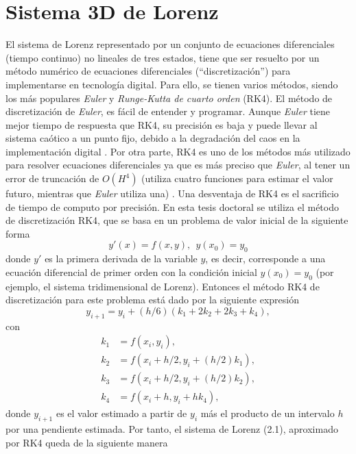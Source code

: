 \section{Sistema 3D de Lorenz}
El sistema de Lorenz representado por un conjunto de ecuaciones diferenciales (tiempo continuo) no lineales de tres estados, tiene que ser resuelto por un método numérico de ecuaciones diferenciales (``discretización'') para  implementarse en tecnología digital. Para ello, se tienen varios métodos, siendo los más populares \textit{Euler} y \textit{Runge-Kutta de cuarto orden} (RK4). El método de discretización de \textit{Euler}, es fácil de entender y programar. Aunque \textit{Euler} tiene mejor tiempo de respuesta que RK4, su precisión es baja y puede llevar al sistema caótico a un punto fijo, debido a la degradación del caos en la implementación digital \cite{ZEtAl_2011a}. Por otra parte, RK4 es uno de los métodos más utilizado para resolver ecuaciones diferenciales ya que es más preciso que \textit{Euler}, al tener un error de truncación de $O(H^{4})$ (utiliza cuatro funciones para estimar el valor futuro, mientras que \textit{Euler} utiliza una) \cite{YEtAl_2005}. Una desventaja de RK4 es el sacrificio de tiempo de computo por precisión. En esta tesis doctoral se utiliza el método de discretización RK4, que se basa en un problema de valor inicial de la siguiente forma
\begin{equation}
y'(x)=f(x,y),~~y(x_{0})=y_{0}
\end{equation}
donde $y'$ es la primera derivada de la variable $y$, es decir, corresponde a una ecuación diferencial de primer orden con la condición inicial $y(x_{0})=y_{0}$ (por ejemplo, el sistema tridimensional de Lorenz). Entonces el método RK4 de discretización para este problema está dado por la siguiente expresión
\begin{equation}
y_{i+1}=y_{i}+(h/6)(k_{1}+2k_{2}+2k_{3}+k_{4}),
\end{equation}
con
\begin{subequations}
\begin{align}
k_{1}&=f(x_{i},y_{i}), \\
k_{2}&=f(x_{i}+h/2,y_{i}+(h/2)k_{1}), \\
k_{3}&=f(x_{i}+h/2,y_{i}+(h/2)k_{2}), \\
k_{4}&=f(x_{i}+h,y_{i}+hk_{4}), 
\end{align}
\end{subequations}
donde $y_{i+1}$ es el valor estimado a partir de $y_{i}$ más el producto de un intervalo $h$ por una pendiente estimada. Por tanto, el sistema de Lorenz (2.1), aproximado por RK4 queda de la siguiente manera

